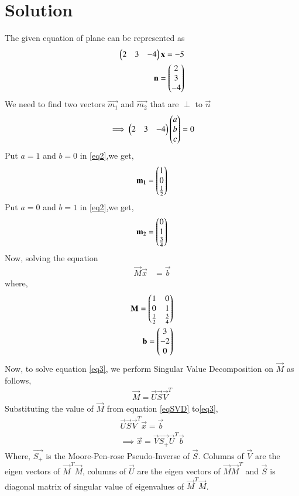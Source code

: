 \documentclass[journal,12pt,twocolumn]{IEEEtran}
\begin{document}
\section{Solution}
The given equation of plane can be represented as
\begin{align}
    \myvec{2 & 3 & -4}\Vec{x}=-5\label{eq1}\\
    \vec{n}=\myvec{2\\3\\-4}
\end{align}
We need to find two vectors $\vec{m_1}$ and $\Vec{m_2}$ that are $\perp$ to $\vec{n}$
\begin{align}\label{eq2}
	\implies\begin{pmatrix}2 & 3 & -4\end{pmatrix}\begin{pmatrix}a\\b\\c\end{pmatrix} = 0
\end{align}
Put $a=1$ and $b=0$ in \eqref{eq2},we get,
\begin{align}
    \Vec{m_1}=\myvec{1\\0\\\frac{1}{2}}
\end{align}
Put $a=0$ and $b=1$ in \eqref{eq2},we get,
\begin{align}
    \Vec{m_2}=\myvec{0\\1\\\frac{3}{4}}
\end{align}
Now, solving the equation
\begin{align}
	\label{eq3}\vec{M}\Vec{x} &= \vec{b}
\end{align}
where,
\begin{align}
\Vec{M}=\myvec{1&0\\0&1\\\frac{1}{2}&\frac{3}{4}}&\\
    \vec{b}=\myvec{3\\-2\\0}&
\end{align}
Now, to solve equation \eqref{eq3}, we perform Singular Value Decomposition on $\vec{M}$ as follows,
\begin{align}
\vec{M}=\vec{U}\vec{S}\vec{V}^T\label{eqSVD}
\end{align}
Substituting the value of $\Vec{M}$ from equation \eqref{eqSVD} to\eqref{eq3},
\begin{align}
    \vec{U}\vec{S}\vec{V}^T\Vec{x}=\vec{b}\\
    \implies \vec{x}=\vec{V}\vec{S_+}\vec{U}^T\Vec{b} \label{eqX}
\end{align}
Where, $\Vec{S_+}$ is the Moore-Pen-rose Pseudo-Inverse of $\Vec{S}$. Columns of $\vec{V}$ are the eigen vectors of $\vec{M}^T\vec{M}$, columns of $\vec{U}$ are the eigen vectors of $\vec{M}\vec{M}^T$ and $\vec{S}$ is diagonal matrix of singular value of eigenvalues of $\vec{M}^T\vec{M}$.
\end{document}
